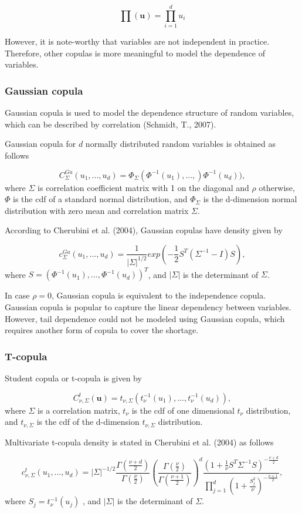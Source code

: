 \documentclass[12pt,a4paper]{article}
\numberwithin{equation}{section}
\begin{document}
 \[\prod (\textbf{u}) =\prod_{i=1}^{d} u_i\]
 
 However, it is note-worthy that variables are not independent in practice. Therefore, other copulas is more meaningful to model the dependence of variables.
 
 \subsubsection{Gaussian copula}
 Gaussian copula is used to model the dependence structure of random variables, which can be described by correlation (Schmidt, T., 2007).
 
 Gaussian copula for $d$ normally distributed random variables is obtained as follows
 
 \[C_\Sigma^{Ga}(u_1,..., u_d) = \Phi_\Sigma(\Phi^{-1}(u_1), ..., ) \Phi^{-1}(u_d)),\]
 where $\Sigma$ is correlation coefficient matrix with 1 on the diagonal and $\rho$ otherwise, $\Phi$ is the cdf of a standard normal distribution, and  $\Phi_\Sigma$ is the d-dimension normal distribution with zero mean and correlation matrix $\Sigma$.
 
 According to Cherubini et al. (2004), Gaussian copulas have density given by
 
 \[c_\Sigma^{Ga}(u_1, ..., u_d) = \frac{1}{|\Sigma|^{1/2}} exp \left(-\frac{1}{2}S^T (\Sigma^{-1} - I) S \right),\]
 where $S = (\Phi^{-1}(u_1),...,\Phi^{-1}(u_d))^T$, and $|\Sigma|$ is the determinant of $\Sigma$.
 
 In case $\rho = 0$, Gaussian copula is equivalent to the independence copula. Gaussian copula is popular to capture the linear dependency between variables. However, tail dependence could not be modeled using Gaussian copula, which requires another form of copula to cover the shortage.
 
 \subsubsection{T-copula}
Student copula or t-copula is given by
 
 \[C_{\nu, \Sigma}^t (\textbf{u}) = t_{\nu, \Sigma}(t_\nu^{-1}(u_1), ..., t_\nu^{-1}(u_d)),\]
 where $\Sigma$ is a correlation matrix, $t_\nu$ is the cdf of one dimensional $t_\nu$ distribution, and $t_{\nu, \Sigma}$ is the cdf of the d-dimension $t_{\nu, \Sigma}$ distribution.
 
 Multivariate t-copula density is stated in Cherubini et al. (2004) as follows
 
 \[ c_{\nu, \Sigma}^t (u_1, ..., u_d) = |\Sigma|^{-1/2} \frac{\Gamma \left(\frac{\nu+d}{2}\right)}{\Gamma \left(\frac{\nu}{2}\right)} \left( \frac{\Gamma \left( \frac{\nu}{2} \right)}{\Gamma \left( \frac{\nu+1}{2} \right)}\right)^d \frac{\left( 1+\frac{1}{\nu} S^T \Sigma^{-1} S\right)^{-\frac{\nu+d}{2}}}{\prod_{j=1}^{d} \left( 1+\frac{S_j^2}{\nu} \right)^{-\frac{\nu+1}{2}}},\]
 where $S_j = t_\nu^{-1}(u_j)$ , and $|\Sigma|$ is the determinant of $\Sigma$.
 
\end{document}
